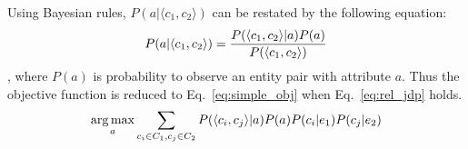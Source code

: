 Using Bayesian rules, $P(a| \langle c_{1},c_{2} \rangle )$ can be restated by the following equation:
\begin{equation}
\label{eq:target_expand1}
\small
P(a|\langle c_{1},c_{2} \rangle)= \frac{ P(\langle c_{1},c_{2}\rangle|a)P(a) }{ P(\langle c_{1},c_{2}\rangle) }
\end{equation},
where $P(a)$ is probability to observe an entity pair with attribute $a$.
Thus the objective function is reduced to Eq.~\ref{eq:simple_obj} when Eq.~\ref{eq:rel_jdp} holds.
\begin{equation}
\label{eq:simple_obj}
\small
 \argmax_a \sum_{c_i\in C_1, c_j\in C_2} P(\langle c_{i},c_{j}\rangle |a) P(a) P(c_i|e_1) P(c_j|e_2)
\end{equation}




%


